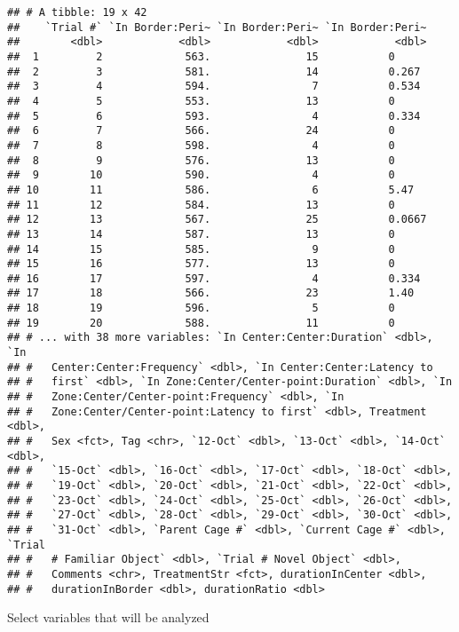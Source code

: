 \documentclass[]{article}
\begin{document}
\begin{verbatim}
## # A tibble: 19 x 42
##    `Trial #` `In Border:Peri~ `In Border:Peri~ `In Border:Peri~
##        <dbl>            <dbl>            <dbl>            <dbl>
##  1         2             563.               15           0     
##  2         3             581.               14           0.267 
##  3         4             594.                7           0.534 
##  4         5             553.               13           0     
##  5         6             593.                4           0.334 
##  6         7             566.               24           0     
##  7         8             598.                4           0     
##  8         9             576.               13           0     
##  9        10             590.                4           0     
## 10        11             586.                6           5.47  
## 11        12             584.               13           0     
## 12        13             567.               25           0.0667
## 13        14             587.               13           0     
## 14        15             585.                9           0     
## 15        16             577.               13           0     
## 16        17             597.                4           0.334 
## 17        18             566.               23           1.40  
## 18        19             596.                5           0     
## 19        20             588.               11           0     
## # ... with 38 more variables: `In Center:Center:Duration` <dbl>, `In
## #   Center:Center:Frequency` <dbl>, `In Center:Center:Latency to
## #   first` <dbl>, `In Zone:Center/Center-point:Duration` <dbl>, `In
## #   Zone:Center/Center-point:Frequency` <dbl>, `In
## #   Zone:Center/Center-point:Latency to first` <dbl>, Treatment <dbl>,
## #   Sex <fct>, Tag <chr>, `12-Oct` <dbl>, `13-Oct` <dbl>, `14-Oct` <dbl>,
## #   `15-Oct` <dbl>, `16-Oct` <dbl>, `17-Oct` <dbl>, `18-Oct` <dbl>,
## #   `19-Oct` <dbl>, `20-Oct` <dbl>, `21-Oct` <dbl>, `22-Oct` <dbl>,
## #   `23-Oct` <dbl>, `24-Oct` <dbl>, `25-Oct` <dbl>, `26-Oct` <dbl>,
## #   `27-Oct` <dbl>, `28-Oct` <dbl>, `29-Oct` <dbl>, `30-Oct` <dbl>,
## #   `31-Oct` <dbl>, `Parent Cage #` <dbl>, `Current Cage #` <dbl>, `Trial
## #   # Familiar Object` <dbl>, `Trial # Novel Object` <dbl>,
## #   Comments <chr>, TreatmentStr <fct>, durationInCenter <dbl>,
## #   durationInBorder <dbl>, durationRatio <dbl>
\end{verbatim}

Select variables that will be analyzed
\end{document}
